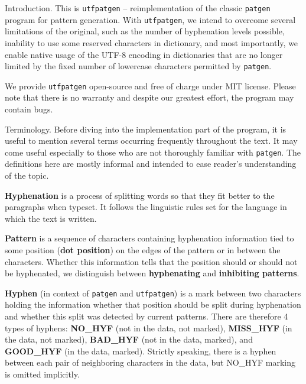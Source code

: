 
\def\title{UTFpatgen}
\def\utfpatgen{{\tt utfpatgen}}
\def\patgen{{\tt patgen}}
\def\lefthyphenminpar{{\tt lefthyphenmin}}
\def\righthyphenminpar{{\tt righthyphenmin}}
\def\hyphstartpar{{\tt hyph\_start}}
\def\hyphfinishpar{{\tt hyph\_finish}}
\def\patstartpar{{\tt pat\_start}}
\def\patfinishpar{{\tt pat\_finish}}
\def\goodwtpar{{\tt good\_wt}}
\def\badwtpar{{\tt bad\_wt}}
\def\threshpar{{\tt thresh}}


Introduction.
This is \utfpatgen{} -- reimplementation of the classic \patgen{} program for
pattern generation. With \utfpatgen, we
intend to overcome several limitations of the original, such as the number of
hyphenation levels possible, inability to
use some reserved characters in dictionary, and most importantly, we enable
native usage of the UTF-8 encoding in
dictionaries that are no longer limited by the fixed number of lowercase
characters permitted by \patgen.

We provide \utfpatgen{} open-source and free of charge under MIT license.
Please note that there is no warranty
and despite our greatest effort, the program may contain bugs.

\fi

Terminology.
Before diving into the implementation part of the program, it is useful to
mention several terms occurring frequently
throughout the text. It may come useful especially to those who are not
thoroughly familiar with \patgen. The
definitions here are mostly informal and intended to ease reader's
understanding of the topic.

{\bf Hyphenation} is a process of splitting words so that they fit better to
the paragraphs when typeset. It follows
the linguistic rules set for the language in which the text is written.

{\bf Pattern} is a sequence of characters containing hyphenation information
tied to some position ({\bf dot
position}) on the edges of the pattern or in between the characters. Whether
this information tells that the position
should or should not be hyphenated, we distinguish between {\bf hyphenating}
and {\bf inhibiting patterns}.

{\bf Hyphen} (in context of \patgen{} and \utfpatgen) is a mark between two
characters holding the information whether
that position should be split during hyphenation and whether this split was
detected by current patterns. There are
therefore 4 types of hyphens: {\bf NO\_HYF} (not in the data, not marked), {\bf
MISS\_HYF} (in the data, not
marked), {\bf BAD\_HYF} (not in the data, marked), and {\bf GOOD\_HYF} (in the
data, marked). Strictly speaking,
there is a hyphen between each pair of neighboring characters in the data, but
NO\_HYF marking is omitted implicitly.

